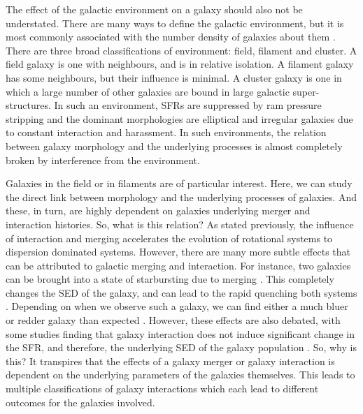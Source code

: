 The effect of the galactic environment on a galaxy should also not be understated. There are many ways to define the galactic environment, but it is most commonly associated with the number density of galaxies about them \citep{2003ApJ...585..694E, 2004ApJ...615L.101B}. There are three broad classifications of environment: field, filament and cluster. A field galaxy is one with neighbours, and is in relative isolation. A filament galaxy has some neighbours, but their influence is minimal. A cluster galaxy is one in which a large number of other galaxies are bound in large galactic super-structures. In such an environment, SFRs are suppressed \citep{2006MNRAS.373..469B} by ram pressure stripping and the dominant morphologies are elliptical and irregular galaxies due to constant interaction and harassment. In such environments, the relation between galaxy morphology and the underlying processes is almost completely broken by interference from the environment.

Galaxies in the field or in filaments are of particular interest. Here, we can study the direct link between morphology and the underlying processes of galaxies. And these, in turn, are highly dependent on galaxies underlying merger and interaction histories. So, what is this relation? As stated previously, the influence of interaction and merging accelerates the evolution of rotational systems to dispersion dominated systems. However, there are many more subtle effects that can be attributed to galactic merging and interaction. For instance, two galaxies can be brought into a state of starbursting due to merging \citep{2008MNRAS.385L..38M}. This completely changes the SED of the galaxy, and can lead to the rapid quenching both systems \citep{2018MNRAS.476.2591V, 2022MNRAS.517L..92E}. Depending on when we observe such a galaxy, we can find either a much bluer or redder galaxy than expected \citep{2007A&A...468...61D}. However, these effects are also debated, with some studies finding that galaxy interaction does not induce significant change in the SFR, and therefore, the underlying SED of the galaxy population \citep{2003A&A...405...31B}. So, why is this? It transpires that the effects of a galaxy merger or galaxy interaction is dependent on the underlying parameters of the galaxies themselves. This leads to multiple classifications of galaxy interactions which each lead to different outcomes for the galaxies involved. 

